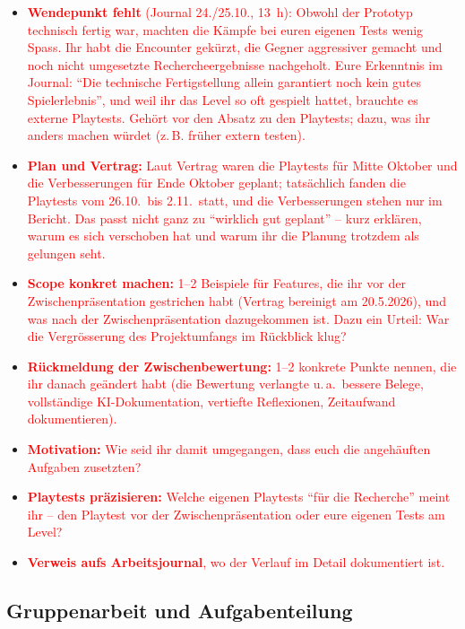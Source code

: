 \documentclass[../Main.tex]{subfiles}
\begin{document}
\begin{itemize}[leftmargin=1.5cm]
    \item \textcolor{red}{\textbf{Wendepunkt fehlt} (Journal 24./25.10., 13~h): Obwohl der Prototyp technisch fertig war, machten die Kämpfe bei euren eigenen Tests wenig Spass. Ihr habt die Encounter gekürzt, die Gegner aggressiver gemacht und noch nicht umgesetzte Rechercheergebnisse nachgeholt. Eure Erkenntnis im Journal: \enquote{Die technische Fertigstellung allein garantiert noch kein gutes Spielerlebnis}, und weil ihr das Level so oft gespielt hattet, brauchte es externe Playtests. Gehört vor den Absatz zu den Playtests; dazu, was ihr anders machen würdet (z.\,B. früher extern testen).}
    \item \textcolor{red}{\textbf{Plan und Vertrag:} Laut Vertrag waren die Playtests für Mitte Oktober und die Verbesserungen für Ende Oktober geplant; tatsächlich fanden die Playtests vom 26.10.\ bis 2.11.\ statt, und die Verbesserungen stehen nur im Bericht. Das passt nicht ganz zu \enquote{wirklich gut geplant} -- kurz erklären, warum es sich verschoben hat und warum ihr die Planung trotzdem als gelungen seht.}
    \item \textcolor{red}{\textbf{Scope konkret machen:} 1--2 Beispiele für Features, die ihr vor der Zwischenpräsentation gestrichen habt (Vertrag bereinigt am 20.5.2026), und was nach der Zwischenpräsentation dazugekommen ist. Dazu ein Urteil: War die Vergrösserung des Projektumfangs im Rückblick klug?}
    \item \textcolor{red}{\textbf{Rückmeldung der Zwischenbewertung:} 1--2 konkrete Punkte nennen, die ihr danach geändert habt (die Bewertung verlangte u.\,a.\ bessere Belege, vollständige KI-Dokumentation, vertiefte Reflexionen, Zeitaufwand dokumentieren).}
    \item \textcolor{red}{\textbf{Motivation:} Wie seid ihr damit umgegangen, dass euch die angehäuften Aufgaben zusetzten?}
    \item \textcolor{red}{\textbf{Playtests präzisieren:} Welche eigenen Playtests \enquote{für die Recherche} meint ihr -- den Playtest vor der Zwischenpräsentation oder eure eigenen Tests am Level?}
    \item \textcolor{red}{\textbf{Verweis aufs Arbeitsjournal}, wo der Verlauf im Detail dokumentiert ist.}
\end{itemize}

\subsection{Gruppenarbeit und Aufgabenteilung}
\end{document}
